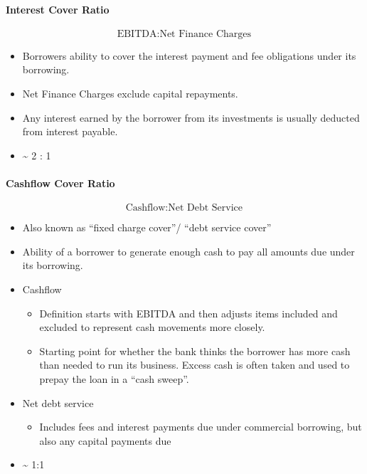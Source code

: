 \documentclass[
]{article}
\providecommand{\tightlist}{%
  \setlength{\itemsep}{0pt}\setlength{\parskip}{0pt}}
\begin{document}
\hypertarget{interest-cover-ratio}{%
\paragraph{Interest Cover Ratio}\label{interest-cover-ratio}}

\[\text{EBITDA}:\text{Net\ Finance\ Charges}\]

\begin{itemize}
\tightlist
\item
  Borrowers ability to cover the interest payment and fee obligations
  under its borrowing.
\item
  Net Finance Charges exclude capital repayments.
\item
  Any interest earned by the borrower from its investments is usually
  deducted from interest payable.
\item
  \textasciitilde{} 2 : 1
\end{itemize}

\hypertarget{cashflow-cover-ratio}{%
\paragraph{Cashflow Cover Ratio}\label{cashflow-cover-ratio}}

\[\text{Cashflow}:\text{Net\ Debt\ Service}\]

\begin{itemize}
\tightlist
\item
  Also known as ``fixed charge cover''/ ``debt service cover''
\item
  Ability of a borrower to generate enough cash to pay all amounts due
  under its borrowing.
\item
  Cashflow

  \begin{itemize}
  \tightlist
  \item
    Definition starts with EBITDA and then adjusts items included and
    excluded to represent cash movements more closely.
  \item
    Starting point for whether the bank thinks the borrower has more
    cash than needed to run its business. Excess cash is often taken and
    used to prepay the loan in a ``cash sweep''.
  \end{itemize}
\item
  Net debt service

  \begin{itemize}
  \tightlist
  \item
    Includes fees and interest payments due under commercial borrowing,
    but also any capital payments due
  \end{itemize}
\item
  \textasciitilde{} 1:1
\end{itemize}
\end{document}
